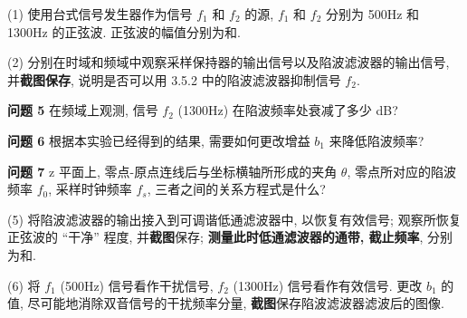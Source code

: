 \documentclass{dspreport}
\begin{document}
(1) 使用台式信号发生器作为信号 $f_1$ 和 $f_2$ 的源, $f_1$ 和 $f_2$ 分别为 500Hz 和 1300Hz 的正弦波. 正弦波的幅值分别为\underline{\blank{  }}和\underline{\blank{  }}.

(2) 分别在时域和频域中观察采样保持器的输出信号以及陷波滤波器的输出信号, 并\textbf{截图保存}, 说明是否可以用 3.5.2 中的陷波滤波器抑制信号 $f_2$.
\begin{block}

\end{block}

\textbf{问题 5} 在频域上观测, 信号 $f_2$ (1300Hz) 在陷波频率处衰减了多少 dB?
\begin{block}

\end{block}

\textbf{问题 6} 根据本实验已经得到的结果, 需要如何更改增益 $b_1$ 来降低陷波频率?
\begin{block}

\end{block}

\textbf{问题 7} z 平面上, 零点-原点连线后与坐标横轴所形成的夹角 $\theta$, 零点所对应的陷波频率 $f_0$, 采样时钟频率 $f_s$, 三者之间的关系方程式是什么?
\begin{block}

\end{block}

(5) 将陷波滤波器的输出接入到可调谐低通滤波器中, 以恢复有效信号; 观察所恢复正弦波的 ``干净'' 程度, 并\textbf{截图}保存; \textbf{测量此时低通滤波器的通带, 截止频率}, 分别为\underline{\blank{  }}和\underline{\blank{  }}.
\begin{block}

\end{block}

\begin{figure}[H]
    \centering
\end{figure}

\begin{block}

\end{block}

(6) 将 $f_1$ (500Hz) 信号看作干扰信号, $f_2$ (1300Hz) 信号看作有效信号. 更改 $b_1$ 的值, 尽可能地消除双音信号的干扰频率分量, \textbf{截图}保存陷波滤波器滤波后的图像.
\begin{block}

\end{block}

\begin{figure}[H]
    \centering
\end{figure}
\end{document}
